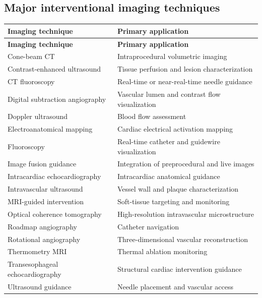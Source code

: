 \subsection{Major interventional imaging techniques}
\begin{longtable}{@{}p{}p{}@{}}
\toprule
\textbf{Imaging technique} & \textbf{Primary application} \\
\midrule
\endfirsthead
\toprule
\textbf{Imaging technique} & \textbf{Primary application} \\
\midrule
\endhead
Cone-beam CT & Intraprocedural volumetric imaging \\
Contrast-enhanced ultrasound & Tissue perfusion and lesion characterization \\
CT fluoroscopy & Real-time or near-real-time needle guidance \\
Digital subtraction angiography & Vascular lumen and contrast flow visualization \\
Doppler ultrasound & Blood flow assessment \\
Electroanatomical mapping & Cardiac electrical activation mapping \\
Fluoroscopy & Real-time catheter and guidewire visualization \\
Image fusion guidance & Integration of preprocedural and live images \\
Intracardiac echocardiography & Intracardiac anatomical guidance \\
Intravascular ultrasound & Vessel wall and plaque characterization \\
MRI-guided intervention & Soft-tissue targeting and monitoring \\
Optical coherence tomography & High-resolution intravascular microstructure \\
Roadmap angiography & Catheter navigation \\
Rotational angiography & Three-dimensional vascular reconstruction \\
Thermometry MRI & Thermal ablation monitoring \\
Transesophageal echocardiography & Structural cardiac intervention guidance \\
Ultrasound guidance & Needle placement and vascular access \\
\bottomrule
\end{longtable}

